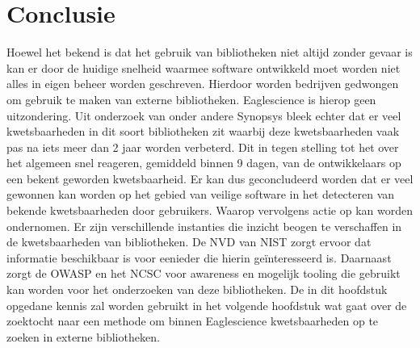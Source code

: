 \section{Conclusie}\label{sec:soupTheorieconclusie}
Hoewel het bekend is dat het gebruik van bibliotheken niet altijd zonder gevaar is kan er door de huidige snelheid waarmee software ontwikkeld moet worden niet alles in eigen beheer worden geschreven. Hierdoor worden bedrijven gedwongen om gebruik te maken van externe bibliotheken. Eaglescience is hierop geen uitzondering. Uit onderzoek van onder andere Synopsys bleek echter dat er veel kwetsbaarheden in dit soort bibliotheken zit waarbij deze kwetsbaarheden vaak pas na iets meer dan 2 jaar worden verbeterd. Dit in tegen stelling tot het over het algemeen snel reageren, gemiddeld binnen 9 dagen, van de ontwikkelaars op een bekent geworden kwetsbaarheid. Er kan dus geconcludeerd worden dat er veel gewonnen kan worden op het gebied van veilige software in het detecteren van bekende kwetsbaarheden door gebruikers. Waarop vervolgens actie op kan worden ondernomen. Er zijn verschillende instanties die inzicht beogen te verschaffen in de kwetsbaarheden van bibliotheken. De NVD van NIST zorgt ervoor dat informatie beschikbaar is voor eenieder die hierin geïnteresseerd is. Daarnaast zorgt de OWASP  en het NCSC voor awareness en mogelijk tooling die gebruikt kan worden voor het onderzoeken van deze bibliotheken. De in dit hoofdstuk opgedane kennis zal worden gebruikt in het volgende hoofdstuk wat gaat over de zoektocht naar een methode om binnen Eaglescience kwetsbaarheden op te zoeken in externe bibliotheken.
